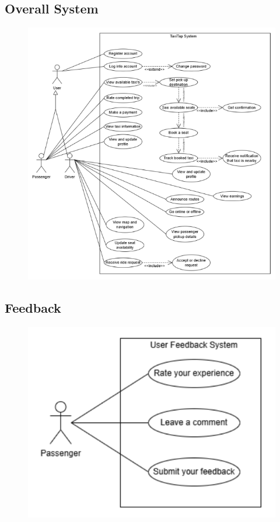 \documentclass[a4paper,12pt]{article}
\begin{document}
  \subsection*{Overall System}
    \begin{figure}[H]
      \centering
      \includegraphics[width=1\textwidth]{OverallSystem.png} 
    \end{figure}
  \subsection*{Feedback}
    \begin{figure}[H]
      \centering
      \includegraphics[width=1\textwidth]{UserFeedback.png} 
    \end{figure}
\end{document}
